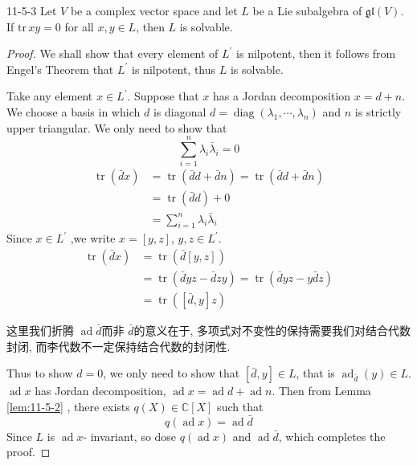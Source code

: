 \documentclass[../main.tex]{subfiles}
\begin{document}
\begin{proposition}{}{11-5-3}
Let $V$ be a complex vector space and let $L$ be a Lie subalgebra of $\mathfrak{gl}(V)$. If $\mathrm{tr}\,xy = 0$ for all $x, y \in L$, then $L$ is solvable.
\end{proposition}
\begin{proof}
    We shall show that every element of \(  L^{\prime}   \) is nilpotent, then it follows from Engel's Theorem that \(  L^{\prime}   \) is nilpotent, thus \(  L  \) is solvable.
    
    Take any element \(  x \in L^{\prime}   \). Suppose that \(  x  \) has a Jordan decomposition \(  x= d+ n  \). We choose a basis in which \(  d  \) is diagonal \(  d= \operatorname{diag} \left(  \lambda _1 ,\cdots , \lambda _{n} \right)    \) and \(  n  \) is strictly upper triangular. We only need to show that \[
    \sum _{i= 1}^{n}  \lambda _{i}  \bar{\lambda}_{i}= 0
    \]    \[
   \begin{aligned}
    \operatorname{tr}\left( \bar{d}x \right) &= \operatorname{tr}\left( \bar{d} d+  \bar{d}n \right)= \operatorname{tr}\left( \bar{d}d+ \bar{d}n \right)\\ 
     &= \operatorname{tr}\left( \bar{d}d \right)+ 0\\ 
      &= \sum _{i= 1}^{n} \lambda _{i}  \bar{\lambda}_{i}    
   \end{aligned}
    \] Since \(  x\in L^{\prime}   \) ,we write \(  x= \left[ y,z \right]   \), \(  y,z\in L^{\prime}   \). \[
   \begin{aligned}
   \operatorname{tr} \left( \bar{d}x \right) &= \operatorname{tr}\left( \bar{d}\left[ y,z \right]  \right)\\ 
    &= \operatorname{tr}\left( \bar{d}yz- \bar{d}zy \right)= \operatorname{tr}\left( \bar{d}yz- y \bar{d}z\right)   \\ 
     &= \operatorname{tr}\left( \left[ \bar{d},y \right]z   \right) 
   \end{aligned}
    \]  
    
    \begin{note}
        这里我们折腾 \(  \operatorname{ad} \bar{d}  \)而非 \(  \bar{d}  \)的意义在于, 多项式对不变性的保持需要我们对结合代数封闭, 而李代数不一定保持结合代数的封闭性.  
    \end{note}
    Thus to show \(  d= 0  \), we only need to show that \(  \left[ \bar{d},y \right]\in L   \), that is \(  \operatorname{ad}_{\bar{d}}\left( y \right)\in L   \).   \(  \operatorname{ad}x  \) has Jordan decomposition, \(  \operatorname{ad}x= \operatorname{ad}d+ \operatorname{ad} n \). Then from Lemma \ref{lem:11-5-2}  , there exists  \(  q\left( X \right)\in \mathbb{C}\left[ X \right]    \) such that  \[
    q\left( \operatorname{ad}x \right) = \operatorname{ad} \bar{d}
    \]  Since \(  L  \) is \(  \operatorname{ad}x  \)-   invariant, so dose \(  q\left( \operatorname{ad}x \right)   \) and \(  \operatorname{ad}\bar{d}  \), which completes the proof.    
\end{proof}
\end{document}
